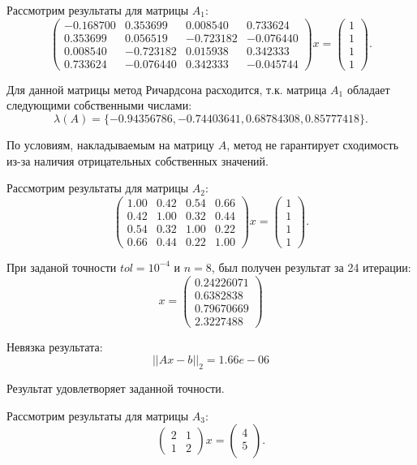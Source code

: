 \documentclass[a4paper,12pt]{article}
\begin{document}
		Рассмотрим результаты для матрицы $A_1$:
		\[
		\begin{pmatrix}
			-0.168700 & 0.353699 & 0.008540 & 0.733624 \\
			0.353699 & 0.056519 & -0.723182 & -0.076440 \\
			0.008540 & -0.723182 & 0.015938 & 0.342333 \\
			0.733624 & -0.076440 & 0.342333 & -0.045744
		\end{pmatrix}
		x = 
		\begin{pmatrix}
			1\\
			1\\
			1\\
			1
		\end{pmatrix}.
		\]
	
		Для данной матрицы метод Ричардсона расходится, т.к. матрица $A_1$ обладает следующими собственными числами:
		\[ \lambda (A) = \{ -0.94356786, -0.74403641,  0.68784308,  0.85777418 \}.\]
	
		По условиям, накладываемым на матрицу $A$, метод не гарантирует сходимость из-за наличия отрицательных собственных значений. 
		
	
		Рассмотрим результаты для матрицы $A_2$:
		\[
			\begin{pmatrix}
				1.00 & 0.42 & 0.54 & 0.66 \\
				0.42 & 1.00 & 0.32 & 0.44 \\
				0.54 & 0.32 & 1.00 & 0.22 \\
				0.66 & 0.44 & 0.22 & 1.00
			\end{pmatrix} x = 
			\begin{pmatrix}
				1\\1\\1\\1
			\end{pmatrix}.
		\]	
	
		При заданой точности $tol=10^{-4}$ и $n=8$, был получен результат за 24 итерации:
		\[
			x = 
			\begin{pmatrix}
				0.24226071 \\ 0.6382838\\  0.79670669\\ 2.3227488
			\end{pmatrix}
		\]
	
		Невязка результата:
		\[
			||Ax - b||_2 = 1.66e-06
		\]
		
	Результат удовлетворяет заданной точности.
	
	Рассмотрим результаты для матрицы $A_3$:
	\[
	\begin{pmatrix}
		2 & 1  \\
		1 & 2
		
	\end{pmatrix} x = 
	\begin{pmatrix}
		4\\5\\
	\end{pmatrix}.
	\]	
	
\end{document}
